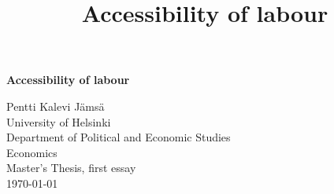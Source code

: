 \documentclass[a4paper, 12 pt]{article}   	%
\title{Accessibility of labour}
\begin{document}
\begin{titlepage} %
\begin{center}	
	\vspace*{\fill}
   	
	{\Huge\bfseries Accessibility of labour}
	\end{center}
	
	\vfill
	\raggedleft
	{\Large Pentti Kalevi Jämsä}\\
	\vspace{1.5mm}
	\raggedleft
	{\Large University of Helsinki}\\
	\vspace{1.5mm}
	{\Large Department of Political and Economic Studies}\\
	\vspace{1.5mm}
	{\Large Economics}\\
	\vspace{1.5mm}
	{\Large Master's Thesis, first essay}\\
\vspace{1.5mm}
	{\Large \today}
	
\end{titlepage}

\tableofcontents
\thispagestyle{empty}
\newpage
\setcounter{page}{1}





\nocite{geurs, melo, laakso, venables2007, venables2017, andersson, mackie, marshall, pilegaard, small, liikenne, goebel, brueckner, alonso, mills, muth, mcmillen, fujita, hsl, rosenthal, evers, van, guti, oosterhaven, logsum, train, lakshman, hesy, helmet}




\end{document}
